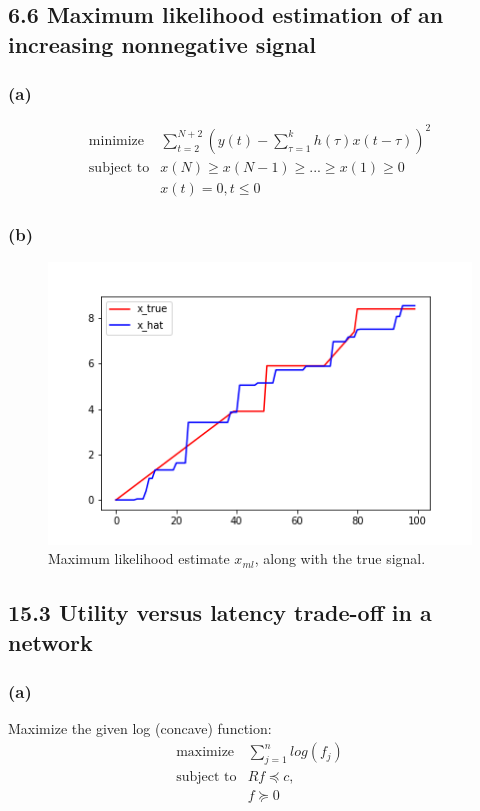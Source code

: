 \documentclass{article}
\begin{document}
\subsection*{6.6 Maximum likelihood estimation of an increasing nonnegative signal}
\subsubsection*{(a)}
    \[  \boxed{  \begin{array}{ll}
    \mbox{minimize}   &\sum_{t=2}^{N+2}(y(t)-\sum_{\tau=1}^{k}h(\tau)x(t-\tau))^2 \\
    \mbox{subject to} & x(N) \ge x(N-1) \ge ... \ge x(1) \ge 0 \\
    & x(t) = 0, t \le 0
        \end{array} 
   }
  \]   

\subsubsection*{(b)}

   \begin{figure}[h!]
\begin{center}
  \includegraphics[width=.4\linewidth]{prob_66.png}
\end{center}
\caption{Maximum likelihood estimate $x_{ml}$, along with the true signal.}
\end{figure}
\subsection*{15.3 Utility versus latency trade-off in a network}	
\subsubsection*{(a)}
Maximize the given log (concave) function:
 \[  \boxed{  \begin{array}{ll}
    \mbox{maximize}   &\sum_{j=1}^{n}log(f_j)\\
    \mbox{subject to} & Rf \preceq c,\\
    &  f \succeq 0
            \end{array} 
   }
  \]   
\end{document}
